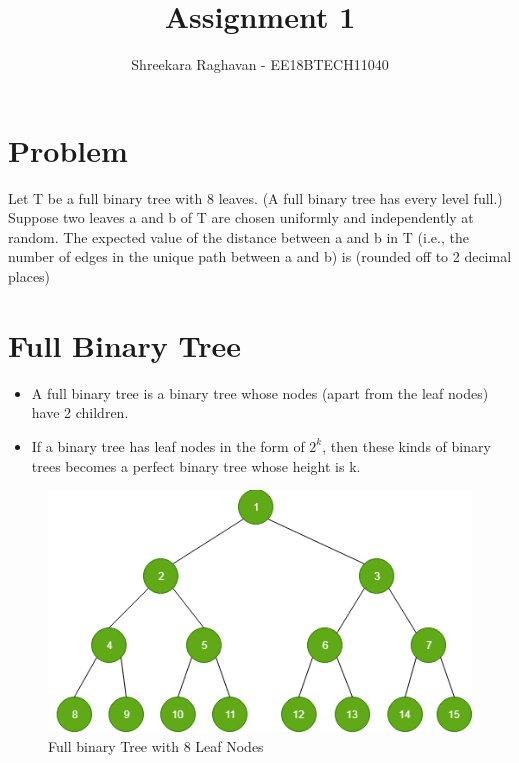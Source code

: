\documentclass[journal,12pt,twocolumn]{IEEEtran}
\begin{document}
\title{Assignment 1}
\author{Shreekara Raghavan - EE18BTECH11040}
\maketitle
\newpage
\bigskip
\renewcommand{\thefigure}{\theenumi}
\renewcommand{\thetable}{\theenumi}


\section{Problem}
Let T be a full binary tree with 8 leaves. (A full binary tree has every level full.) Suppose two leaves a and b of T are chosen uniformly and independently at random. The expected value of the distance between a and b in T (i.e., the number of edges in the unique path between a and b) is (rounded off to 2 decimal places)



\section{Full Binary Tree}
\begin{itemize}
    \item A full binary tree is a binary tree whose nodes (apart from the leaf nodes) have 2 children.
    \\
    \item If a binary tree has leaf nodes in the form of $ 2^{k}$, then these kinds of binary trees becomes a perfect binary tree whose height is k.
\end{itemize}

\begin{figure}[!h]
    \centering
    \includegraphics[scale = 0.7]{Perfect-Binary-Tree2.png}
    \caption{Full binary Tree with 8 Leaf Nodes}
    \label{fig:2}
\end{figure}
\end{document}
